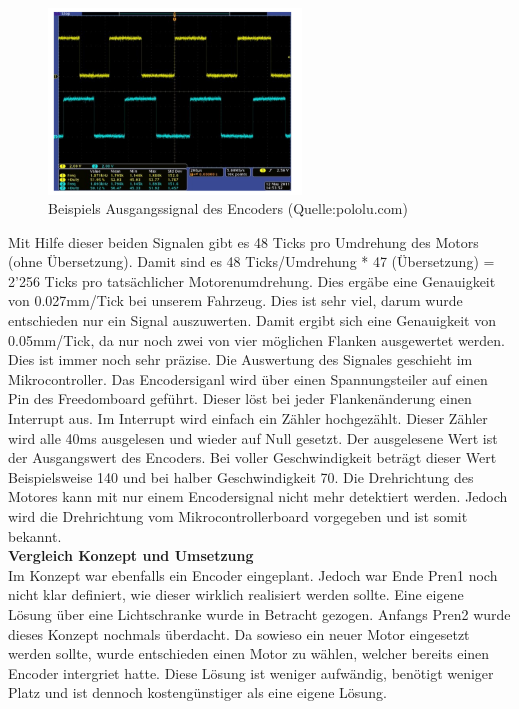 \begin{figure}[H]%
\centering
\includegraphics[width=0.6\textwidth]{03_Loesungskonzept/pictures/Encoder_Out.png}
\caption{Beispiels Ausgangssignal des Encoders (Quelle:pololu.com)}
\label{fig:encoder_out}
\end{figure}
Mit Hilfe dieser beiden Signalen gibt es 48 Ticks pro Umdrehung des Motors (ohne Übersetzung). Damit sind es 48 Ticks/Umdrehung * 47 (Übersetzung) = 2'256 Ticks pro tatsächlicher Motorenumdrehung. Dies ergäbe eine Genauigkeit von 0.027mm/Tick bei unserem Fahrzeug. Dies ist sehr viel, darum wurde entschieden nur ein Signal auszuwerten. Damit ergibt sich eine Genauigkeit von 0.05mm/Tick, da nur noch zwei von vier möglichen Flanken ausgewertet werden. Dies ist immer noch sehr präzise. Die Auswertung des Signales geschieht im Mikrocontroller. Das Encodersiganl wird über einen Spannungsteiler auf einen Pin des Freedomboard geführt. Dieser löst bei jeder Flankenänderung einen Interrupt aus. Im Interrupt wird einfach ein Zähler hochgezählt. Dieser Zähler wird alle 40ms ausgelesen und wieder auf Null gesetzt. Der ausgelesene Wert ist der Ausgangswert des Encoders. Bei voller Geschwindigkeit beträgt dieser Wert Beispielsweise 140 und bei halber Geschwindigkeit 70. Die Drehrichtung des Motores kann mit nur einem Encodersignal nicht mehr detektiert werden. Jedoch wird die Drehrichtung vom Mikrocontrollerboard vorgegeben und ist somit bekannt.\\[0.2cm]
\textbf{Vergleich Konzept und Umsetzung}\\[0.2cm]
Im Konzept war ebenfalls ein Encoder eingeplant. Jedoch war Ende Pren1 noch nicht klar definiert, wie dieser wirklich realisiert werden sollte. Eine eigene Lösung über eine Lichtschranke wurde in Betracht gezogen. Anfangs Pren2 wurde dieses Konzept nochmals überdacht. Da sowieso ein neuer Motor eingesetzt werden sollte, wurde entschieden einen Motor zu wählen, welcher bereits einen Encoder intergriet hatte. Diese Lösung ist weniger aufwändig, benötigt weniger Platz und ist dennoch kostengünstiger als eine eigene Lösung.\\[0.2cm]
